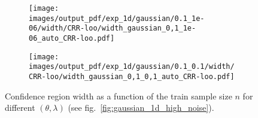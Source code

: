 \documentclass[a4paper,14pt]{extarticle}
\begin{document}
\begin{figure}
\begin{subfigure}[b]{0.25\linewidth}
  \end{subfigure}%
  \begin{subfigure}[b]{0.25\linewidth}
    \texttt{[image: images/output\_pdf/exp\_1d/gaussian/0.1\_1e-06/width/CRR-loo/width\_gaussian\_0,1\_1e-06\_auto\_CRR-loo.pdf]}
    \caption{} \label{fig:gaussian_1d_high_noise_width_c3}
  \end{subfigure}%
  \begin{subfigure}[b]{0.25\linewidth}
    \texttt{[image: images/output\_pdf/exp\_1d/gaussian/0.1\_0.1/width/CRR-loo/width\_gaussian\_0,1\_0,1\_auto\_CRR-loo.pdf]}
    \caption{} \label{fig:gaussian_1d_high_noise_width_c4}
  \end{subfigure}
  \caption{Confidence region width as a function of the train sample size $n$ for
  different $(\theta, \lambda)$ (see fig.~\ref{fig:gaussian_1d_high_noise}).}
  \label{fig:gaussian_1d_high_noise_width}
\end{figure}
\end{document}
